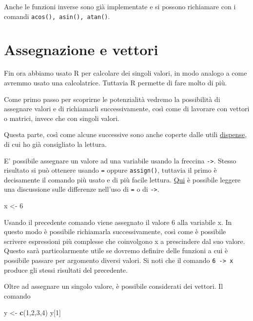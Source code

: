\documentclass[]{book}
\newenvironment{Shaded}{\begin{snugshade}}{\end{snugshade}}
\newcommand{\DecValTok}[1]{\textcolor[rgb]{0.00,0.00,0.81}{#1}}
\newcommand{\KeywordTok}[1]{\textcolor[rgb]{0.13,0.29,0.53}{\textbf{#1}}}
\newcommand{\NormalTok}[1]{#1}
\newcommand{\StringTok}[1]{\textcolor[rgb]{0.31,0.60,0.02}{#1}}
\begin{document}
Anche le funzioni inverse sono già implementate e si possono richiamare con i comandi \texttt{acos(),\ asin(),\ atan()}.

\hypertarget{assegnazione-e-vettori}{%
\section{Assegnazione e vettori}\label{assegnazione-e-vettori}}

Fin ora abbiamo usato R per calcolare dei singoli valori, in modo analogo a come avremmo usato una calcolatrice. Tuttavia R permette di fare molto di più.

Come primo passo per scoprirne le potenzialità vedremo la possibilità di assegnare valori e di richiamarli successivamente, così come di lavorare con vettori o matrici, invece che con singoli valori.

Questa parte, così come alcune successive sono anche coperte dalle utili \href{https://cran.r-project.org/doc/contrib/Mineo-dispensaR.pdf}{dispense}, di cui ho già consigliato la lettura.

E' possibile assegnare un valore ad una variabile usando la freccina \texttt{-\textgreater{}}. Stesso risultato si può ottenere usando \texttt{=} oppure \texttt{assign()}, tuttavia il primo è decisamente il comando più usato e di più facile lettura. \href{http://stackoverflow.com/questions/1741820/assignment-operators-in-r-and}{Qui} è possibile leggere una discussione sulle differenze nell'uso di \texttt{=} o di \texttt{-\textgreater{}}.

\begin{Shaded}
\begin{Highlighting}[]
\NormalTok{x  <-}\StringTok{ }\DecValTok{6}
\end{Highlighting}
\end{Shaded}

Usando il precedente comando viene assegnato il valore 6 alla variabile x. In questo modo è possibile richiamarla successivamente, così come è possibile scrivere espressioni più complesse che coinvolgono x a prescindere dal suo valore. Questo sarà particolarmente utile se dovremo definire delle funzioni a cui è possibile passare per argomento diversi valori.
Si noti che il comando \texttt{6\ -\textgreater{}\ x} produce gli stessi risultati del precedente.

Oltre ad assegnare un singolo valore, è possibile considerati dei vettori.
Il comando

\begin{Shaded}
\begin{Highlighting}[]
\NormalTok{y <-}\StringTok{ }\KeywordTok{c}\NormalTok{(}\DecValTok{1}\NormalTok{,}\DecValTok{2}\NormalTok{,}\DecValTok{3}\NormalTok{,}\DecValTok{4}\NormalTok{)}
\NormalTok{y[}\DecValTok{1}\NormalTok{]}
\end{Highlighting}
\end{Shaded}
\end{document}
